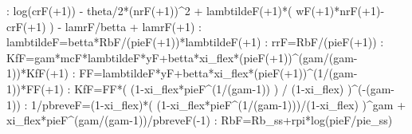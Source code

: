\documentclass{article}%
\begin{document}
   :  log(crF(+1)) {-} theta/2*(nrF(+1))\^{}2 + lambtildeF(+1)*( wF(+1)*nrF(+1){-}crF(+1) ) {-} lamrF/betta + lamrF(+1)\newline%
   :  lambtildeF=betta*RbF/(pieF(+1))*lambtildeF(+1)\newline%
   :  rrF=RbF/(pieF(+1))\newline%
   :  KfF=gam*mcF*lambtildeF*yF+betta*xi\_flex*(pieF(+1))\^{}(gam/(gam{-}1))*KfF(+1)\newline%
   :  FF=lambtildeF*yF+betta*xi\_flex*(pieF(+1))\^{}(1/(gam{-}1))*FF(+1)\newline%
   :  KfF=FF*( (1{-}xi\_flex*pieF\^{}(1/(gam{-}1)) ) / (1{-}xi\_flex) )\^{}({-}(gam{-}1))\newline%
   :  1/pbreveF=(1{-}xi\_flex)*( (1{-}xi\_flex*pieF\^{}(1/(gam{-}1)))/(1{-}xi\_flex) )\^{}gam + xi\_flex*pieF\^{}(gam/(gam{-}1))/pbreveF({-}1)\newline%
   :  RbF=Rb\_ss+rpi*log(pieF/pie\_ss)\newline%

%
\end{document}
